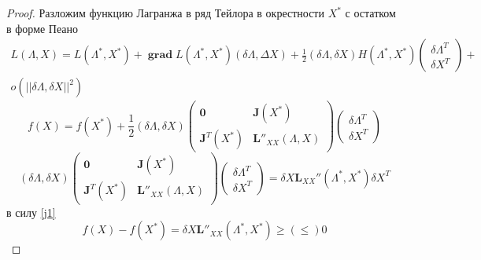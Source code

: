 \documentclass[14pt]{extarticle}
\DeclareMathOperator{\grad}{\textbf{grad}}
\begin{document}
  \begin{proof}
  	Разложим функцию Лагранжа в ряд Тейлора в 
	окрестности $X^{*}$ с остатком в форме Пеано
	\begin{equation}
		\begin{split}
		L(\Lambda,X) =
		L(\Lambda^{*},X^{*}) +
		\grad L(\Lambda^{*},X^{*}) (\delta \Lambda,\Delta X) + \frac{1}{2} (\delta \Lambda,\delta X) H(\Lambda^{*},X^{*}) \begin{pmatrix} 
		\delta \Lambda^{T} \\
		\delta X^{T}
		\end{pmatrix} +\\ o(|| \delta \Lambda,\delta X||^2)
	\end{split}
	\end{equation}
	\begin{equation}
		f(X) = 
		f(X^{*}) + \frac{1}{2} (\delta \Lambda,\delta X)
		\begin{pmatrix} 
			\mathbf{0} & \mathbf{J}(X^{*}) \\
			\mathbf{J}^{T}(X^{*}) & \mathbf{L}''_{XX}(\Lambda,X)
		\end{pmatrix} 
		\begin{pmatrix} 
		\delta \Lambda^{T} \\
		\delta X^{T}
		\end{pmatrix} 
	\end{equation}
	\begin{equation}
		(\delta \Lambda,\delta X)
		\begin{pmatrix} 
			\mathbf{0} & \mathbf{J}(X^{*}) \\
			\mathbf{J}^{T}(X^{*}) & \mathbf{L}''_{XX}(\Lambda,X)
		\end{pmatrix} 
		\begin{pmatrix} 
		\delta \Lambda^{T} \\
		\delta X^{T}
		\end{pmatrix} = \delta X \mathbf{L}_{XX}''(\Lambda^{*},
		X^{*}) \delta X^{T}
	\end{equation}
	в силу \ref{j1}
	\begin{equation}
	f(X) - f(X^{*}) = \delta X \mathbf{L}''_{XX}(\Lambda^{*},X^{*}) \ge  (\le ) 0
	\end{equation} 
  \end{proof}
\end{document}
